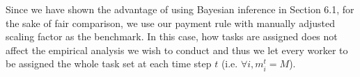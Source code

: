 Since we have shown the advantage of using Bayesian inference in Section 6.1, for the sake of fair comparison, we use our payment rule with manually adjusted scaling factor as the benchmark. 
In this case, how tasks are assigned does not affect the empirical analysis we wish to conduct  and thus we let every worker to be assigned the whole task set at each time step $t$ (i.e. $\forall i, m_i^t = M$).%

%
%
 

